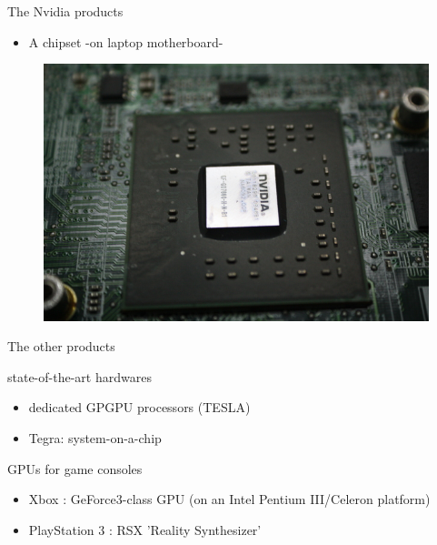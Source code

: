 \documentclass{beamer}
\begin{document}
\begin{frame}{The Nvidia products}
	\transdissolve[duration=0.08]
	\begin{itemize}
		\item<+->{A chipset -on laptop motherboard- }
	\end{itemize}
	\begin{figure}[h]
		\includegraphics[width=1.00\textheight]{images/chipset_motherboard.jpg}
	\end{figure}
\end{frame}


\begin{frame}{The other products}
	\transdissolve[duration=0.1]
	\begin{block}{state-of-the-art hardwares}
		\begin{itemize}
			\item<+->{dedicated GPGPU processors (TESLA)}
			\item<+->{Tegra: system-on-a-chip}
		\end{itemize}
	\end{block}
	\pause
	\begin{block}{GPUs for game consoles}
		\begin{itemize}
			\item<+->{Xbox : GeForce3-class GPU (on an Intel Pentium III/Celeron platform)}
			\item<+->{PlayStation 3 : RSX 'Reality Synthesizer'}
		\end{itemize}
	\end{block}
\end{frame}
\end{document}
